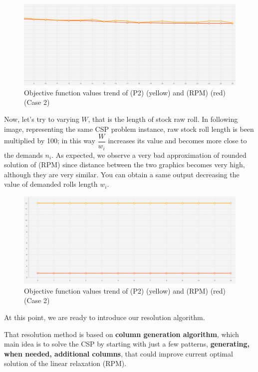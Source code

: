 \documentclass[10pt,a4paper]{article}
\begin{document}
\begin{figure}[H]
\label{img:comp2}
\includegraphics[width=\textwidth]{./images/comparation2.png}
\centering
\caption{Objective function values trend of (P2) (yellow) and (RPM) (red) (Case 2)}
\end{figure}

Now, let's try to varying $W$, that is the length of stock raw roll. In following image, representing the same CSP problem instance, raw stock roll length is been multiplied by 100; in this way $\dfrac{W}{w_i}$ increases its value and becomes more close to the demands $n_i$. As expected, we observe a very bad approximation of rounded solution of (RPM) since distance between the two graphics becomes very high, although they are very similar. You can obtain a same output decreasing the value of demanded rolls length $w_i$.

\begin{figure}[H]
\label{img:comp2}
\includegraphics[width=\textwidth]{./images/comparation3.png}
\centering
\caption{Objective function values trend of (P2) (yellow) and (RPM) (red) (Case 2)}
\end{figure}

At this point, we are ready to introduce our resolution algorithm. 

That resolution method is based on \textbf{column generation algorithm}, which main idea is to solve the CSP by starting with just a few patterns, \textbf{generating, when needed, additional columns}, that could improve current optimal solution of the linear relaxation (RPM). 
\end{document}
